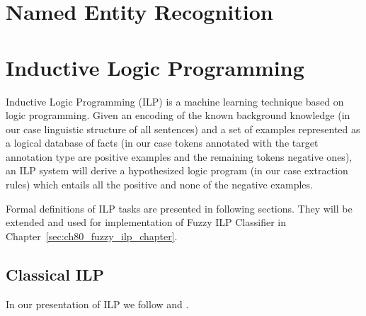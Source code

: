 \section{Named Entity Recognition} \label{sec:ch30_named_entity_recognition}


\section{Inductive Logic Programming} \label{sec:ch30_ILP}

Inductive Logic Programming (ILP) \citep{biblio:MuggletonILP} is a machine learning technique based on logic programming. Given an encoding of the known background knowledge (in our case linguistic structure of all sentences) and a set of examples represented as a logical database of facts (in our case tokens annotated with the target annotation type are positive examples and the remaining tokens negative ones), an ILP system will derive a hypothesized logic program (in our case extraction rules) which entails all the positive and none of the negative examples.

Formal definitions of ILP tasks are presented in following sections. They will be extended and used for implementation of Fuzzy ILP Classifier in Chapter~\ref{sec:ch80_fuzzy_ilp_chapter}.







\subsection{Classical ILP} \label{sec:ch30_ILP_classic}

In our presentation of ILP we follow \cite{dzeroski2001:relat_dm} and  \cite{biblio:Muggleton94inductivelogic}.


\theoremstyle{definition}
\newtheorem{definition}{Definition}
\newtheorem{theorem}{Theorem}

